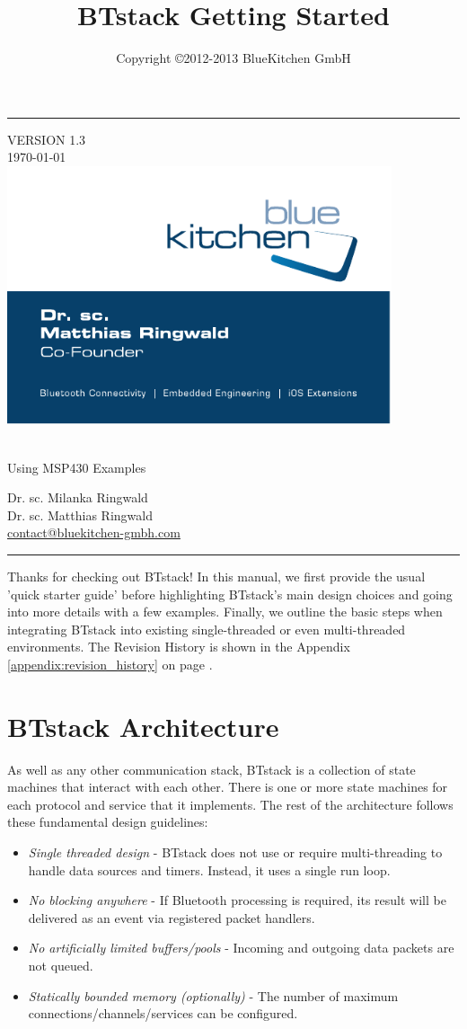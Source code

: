 \documentclass[a4paper,titlepage,oneside,12pt]{amsart} %
\title[BTstack for MSP430] {BTstack Getting Started}
\author{Copyright \copyright  2012-2013 BlueKitchen GmbH}
\makeatletter
\newcommand{\versionNr}{1.3}
\newcommand{\authorMila}{Dr. sc. Milanka Ringwald}
\newcommand{\authorMatthias}{Dr. sc. Matthias Ringwald}
\newcommand{\bkContact}{\href{contact@bluekitchen-gmbh.com}{contact@bluekitchen-gmbh.com}}
\newcommand{\barWidth}{0.3cm}
\renewcommand{\maketitle}{
  \begin{titlepage}
    \fosfamily
    \begin{center}
    \begin{minipage}[b]{\textwidth}
        \begin{minipage}[b]{.1\textwidth}
            \color{bkblue}\rule{\barWidth{}}{22cm}
        \end{minipage}
        \hfill\begin{minipage}[b]{.8\textwidth}\begin{flushright}
            {\color{bkblue}VERSION \versionNr{} \\
            \today \\}
            \vspace*{7.5cm}
            \hfill\includegraphics[width=0.85\textwidth]{picts/bklogo.pdf}
            \vspace*{1.5cm}
            \begin{spacing}{2} 
                {\huge \color{bkblue} \@title} \\ 
                {\Large \color{bklightblue} Using MSP430 Examples}   
            \end{spacing} 
            \vspace*{1.5cm}
            {\color{bkblue}\large \authorMila \\
            \large \authorMatthias \\
            \large \bkContact\\ }
        \end{flushright}\end{minipage}
        \vfill
        \begin{minipage}[b]{\textwidth}
            \color{bklightblue}\rule{\barWidth{}}{\barWidth{}}
        \end{minipage}
    \end{minipage}

    
    \end{center}
  \end{titlepage}
}
\makeatother
\begin{document}
\maketitle

\tableofcontents
\pagebreak


Thanks for checking out BTstack! In this manual, we first provide the usual 'quick starter guide' before highlighting BTstack's main design choices and going into more details with a few examples. Finally, we outline the basic steps when integrating BTstack into existing single-threaded or even multi-threaded environments. The Revision History is shown in the Appendix \ref{appendix:revision_history} on page \pageref{appendix:revision_history}.



\section{BTstack Architecture}

As well as any other communication stack, BTstack is a collection of state machines that interact with each other. There is one or more state machines for each protocol and service that it implements. The rest of the architecture follows these fundamental design guidelines:

\begin{itemize}
\item \emph{Single threaded design} - BTstack does not use or require multi-threading to handle data sources and timers. Instead, it uses a single run loop.
\item \emph{No blocking anywhere} - If Bluetooth processing is required, its result will be delivered as an event via registered packet handlers.
\item \emph{No artificially limited buffers/pools} - Incoming and outgoing data packets are not queued.
\item \emph{Statically bounded memory (optionally)} - The number of maximum connections/channels/services can be configured.
\end{itemize}
\end{document}
